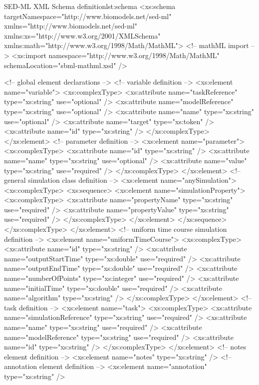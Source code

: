 \footnotesize
\begin{myXmlLst}{SED-ML XML Schema definition}{lst:schema}
<xs:schema targetNamespace="http://www.biomodels.net/sed-ml" xmlns="http://www.biomodels.net/sed-ml" xmlns:xs="http://www.w3.org/2001/XMLSchema" xmlns:math="http://www.w3.org/1998/Math/MathML">
<!-- mathML import -->
<xs:import namespace="http://www.w3.org/1998/Math/MathML" schemaLocation="sbml-mathml.xsd" />

<!-- global element declarations -->
<!-- variable definition -->
<xs:element name="variable">
 <xs:complexType>
  <xs:attribute name="taskReference" type="xs:string" use="optional" />
  <xs:attribute name="modelReference" type="xs:string" use="optional" />
  <xs:attribute name="name" type="xs:string" use="optional" />
  <xs:attribute name="target" type="xs:token" />
  <xs:attribute name="id" type="xs:string" />
 </xs:complexType>
</xs:element>
<!-- parameter definition -->
<xs:element name="parameter">
 <xs:complexType>
  <xs:attribute name="id" type="xs:string" />
  <xs:attribute name="name" type="xs:string" use="optional" />
  <xs:attribute name="value" type="xs:string" use="required" />
 </xs:complexType>
</xs:element>
<!-- general simulation class definition -->
<xs:element name="anySimulation">
 <xs:complexType>
  <xs:sequence>
   <xs:element name="simulationProperty">
    <xs:complexType>
     <xs:attribute name="propertyName" type="xs:string" use="required" />
     <xs:attribute name="propertyValue" type="xs:string" use="required" />
    </xs:complexType>
   </xs:element>
  </xs:sequence>
 </xs:complexType>
</xs:element>
<!-- uniform time course simulation definition -->
<xs:element name="uniformTimeCourse">
 <xs:complexType>
  <xs:attribute name="id" type="xs:string" />
  <xs:attribute name="outputStartTime" type="xs:double" use="required" />
  <xs:attribute name="outputEndTime" type="xs:double" use="required" />
  <xs:attribute name="numberOfPoints" type="xs:integer" use="required" />
  <xs:attribute name="initialTime" type="xs:double" use="required" />
  <xs:attribute name="algorithm" type="xs:string" />
 </xs:complexType>
</xs:element>
<!-- task definition -->
<xs:element name="task">
 <xs:complexType>
  <xs:attribute name="simulationReference" type="xs:string" use="required" />
  <xs:attribute name="name" type="xs:string" use="required" />
  <xs:attribute name="modelReference" type="xs:string" use="required" />
  <xs:attribute name="id" type="xs:string" />
 </xs:complexType>
</xs:element>
<!-- notes element definition -->
<xs:element name="notes" type="xs:string" />
<!-- annotation element definition -->
<xs:element name="annotation" type="xs:string" />


\end{myXmlLst}
